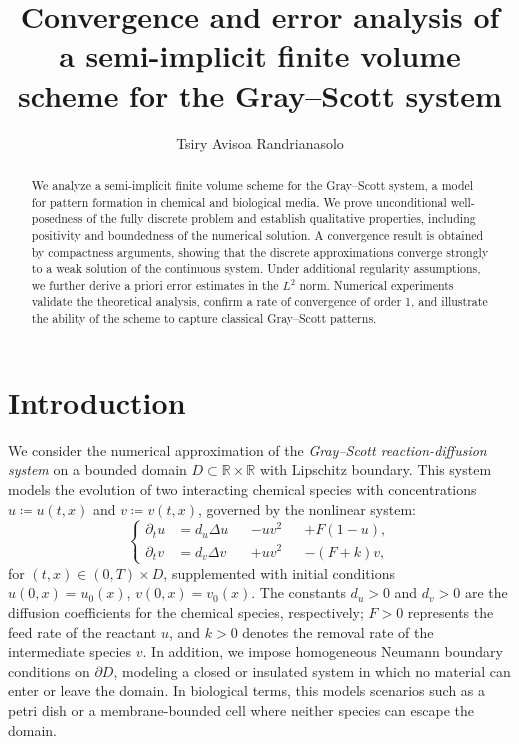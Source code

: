 \documentclass[11pt, a4paper]{amsart}
\title[Finite volume method for the Gray--Scott system]{Convergence and error analysis of a semi-implicit finite volume scheme for the Gray--Scott system}
\author{Tsiry Avisoa Randrianasolo}
\newcommand{\RR}{\mathbb{R}}
\numberwithin{equation}{section}
\begin{document}
	\begin{abstract}
		We analyze a semi-implicit finite volume scheme for the Gray--Scott system, a model for pattern formation in chemical and biological media. We prove unconditional well-posedness of the fully discrete problem and establish qualitative properties, including positivity and boundedness of the numerical solution. A convergence result is obtained by compactness arguments, showing that the discrete approximations converge strongly to a weak solution of the continuous system. Under additional regularity assumptions, we further derive a priori error estimates in the $L^2$ norm. Numerical experiments validate the theoretical analysis, confirm a rate of convergence of order 1, and illustrate the ability of the scheme to capture classical Gray--Scott patterns.
	\end{abstract}
	\maketitle
	
	
	\section{Introduction}\label{sec:intro}

	We consider the numerical approximation of the \emph{Gray--Scott reaction-diffusion system} on a bounded domain $D \subset \RR\times\RR$ with Lipschitz boundary. This system models the evolution of two interacting chemical species with concentrations $u \coloneqq u(t,x)$ and $v \coloneqq v(t,x)$, governed by the nonlinear system:
	\begin{equation} \label{eq:gs}
		\left\{
		\begin{alignedat}{6}
			\partial_t u &= d_u \Delta u &&- uv^2 &&+ F(1 - u), 
			\\
			\partial_t v &= d_v \Delta v &&+ uv^2 &&- (F + k)v,
		\end{alignedat}
		\right.
	\end{equation}
	for $(t,x) \in (0,T)\times D$, supplemented with initial conditions $u(0,x) = u_0(x)$, $v(0,x) = v_0(x)$. The constants $d_u>0$ and $d_v>0$ are the diffusion coefficients for the chemical species, respectively; 
	$F>0$ represents the feed rate of the reactant $u$, and $k>0$ denotes the removal rate of the intermediate species $v$.
	In addition, we impose homogeneous Neumann boundary conditions on $\partial D$, modeling a closed or insulated system in which no material can enter or leave the domain. In biological terms, this models scenarios such as a petri dish or a membrane-bounded cell where neither species can escape the domain.
	
\end{document}

